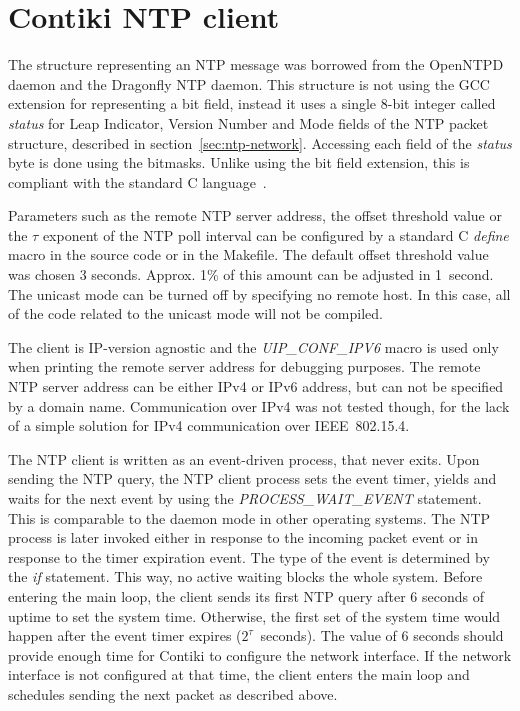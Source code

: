 \newpage
\section{Contiki NTP client}
The structure representing an NTP message was borrowed from the OpenNTPD daemon
and the Dragonfly NTP daemon.
This structure is not using the GCC extension for representing a bit field,
instead it uses a single 8-bit integer called {\it{status}}
for Leap Indicator, Version Number and Mode fields of the NTP packet
structure, described in section~\ref{sec:ntp-network}.
Accessing each field of the {\it{status}} byte is done using the bitmasks.
Unlike using the bit field extension,
this is compliant with the standard C language~\cite{c99}.

Parameters such as the remote NTP server address, the offset threshold value
or the $\tau$ exponent of the NTP poll interval can be configured by a standard C {\it{define}} macro
in the source code or in the Makefile.
The default offset threshold value was chosen 3 seconds.
Approx. 1\% of this amount can be adjusted in 1~second.
The unicast mode can be turned off by specifying no remote host.
In this case, all of the code related to the unicast mode will not be compiled.

The client is IP-version agnostic and the {\it{UIP\_CONF\_IPV6}} macro is used only
when printing the remote server address for debugging purposes.
The remote NTP server address can be either IPv4 or IPv6 address,
but can not be specified by a domain name.
Communication over IPv4 was not tested though, for the lack of a simple solution for
IPv4 communication over IEEE~802.15.4.

The NTP client is written as an event-driven process, that never exits.
Upon sending the NTP query, the NTP client process sets the event timer,
yields and waits for the next event by using the {\it{PROCESS\_WAIT\_EVENT}} statement.
This is comparable to the daemon mode in other operating systems.
The NTP process is later invoked either in response to the incoming packet event
or in response to the timer expiration event.
The type of the event is determined by the {\it{if}} statement.
This way, no active waiting blocks the whole system.
Before entering the main loop, the client sends
its first NTP query after 6 seconds of uptime to set the system time.
Otherwise, the first set of the system time would happen
after the event timer expires ($2^{\tau}$~seconds).
The value of 6 seconds should provide enough time for Contiki to
configure the network interface.
If the network interface is not configured at that time,
the client enters the main loop and schedules sending the next packet as described above.

